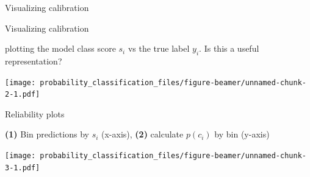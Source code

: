 \documentclass[ignorenonframetext,]{beamer}
\newenvironment{Shaded}{\begin{snugshade}}{\end{snugshade}}
\newcommand{\KeywordTok}[1]{\textcolor[rgb]{0.13,0.29,0.53}{\textbf{{#1}}}}
\newcommand{\DataTypeTok}[1]{\textcolor[rgb]{0.13,0.29,0.53}{{#1}}}
\newcommand{\DecValTok}[1]{\textcolor[rgb]{0.00,0.00,0.81}{{#1}}}
\newcommand{\StringTok}[1]{\textcolor[rgb]{0.31,0.60,0.02}{{#1}}}
\newcommand{\CommentTok}[1]{\textcolor[rgb]{0.56,0.35,0.01}{\textit{{#1}}}}
\newcommand{\NormalTok}[1]{{#1}}
\begin{document}
\begin{frame}[fragile]{Visualizing calibration}

\footnotesize

\begin{Shaded}
\end{Shaded}

\end{frame}

\begin{frame}{Visualizing calibration}

plotting the model class score \(s_i\) vs the true label \(y_i\). Is
this a useful representation?

\texttt{[image: probability\_classification\_files/figure-beamer/unnamed-chunk-2-1.pdf]}

\end{frame}

\begin{frame}{Reliability plots}

\textbf{(1)} Bin predictions by \(s_i\) (x-axis), \textbf{(2)} calculate
\(p(c_i)\) by bin (y-axis)

\footnotesize

\texttt{[image: probability\_classification\_files/figure-beamer/unnamed-chunk-3-1.pdf]}

\end{frame}
\end{document}

